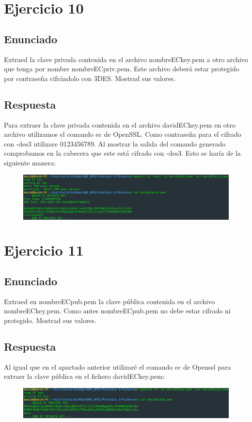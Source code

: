 \documentclass[10pt,a4paper,spanish]{report}
\begin{document}
\chapter{Ejercicio 10}

\section{Enunciado}
\noindent
Extraed la clave privada contenida en el archivo nombreECkey.pem a otro archivo que tenga por nombre nombreECpriv.pem. Este archivo deberá estar protegido por contraseña cifrándolo con 3DES. Mostrad sus valores.

\section{Respuesta}
\noindent
Para extraer la clave privada contenida en el archivo davidECkey.pem en otro archivo utilizamos el comando ec de OpenSSL. Como contraseña para el cifrado con -des3 utilizare 0123456789. Al mostrar la salida del comando generado comprobamos en la cabecera que este está cifrado con -des3. Esto se haría de la siguiente manera:

\begin{figure}[!hbp]
 \centering  \includegraphics[width=1\textwidth]{./Imagenes/10.png}
\end{figure}


\chapter{Ejercicio 11}

\section{Enunciado}
\noindent
Extraed en nombreECpub.pem la clave pública contenida en el archivo nombreECkey.pem. Como antes nombreECpub.pem no debe estar cifrado ni protegido. Mostrad sus valores.

\section{Respuesta}
\noindent
Al igual que en el apartado anterior utilizaré el comando ec de Openssl para extraer la clave pública en el fichero davidECkey.pem:

\begin{figure}[!hbp]
 \centering  \includegraphics[width=1\textwidth]{./Imagenes/11.png}
\end{figure}

\end{document}
